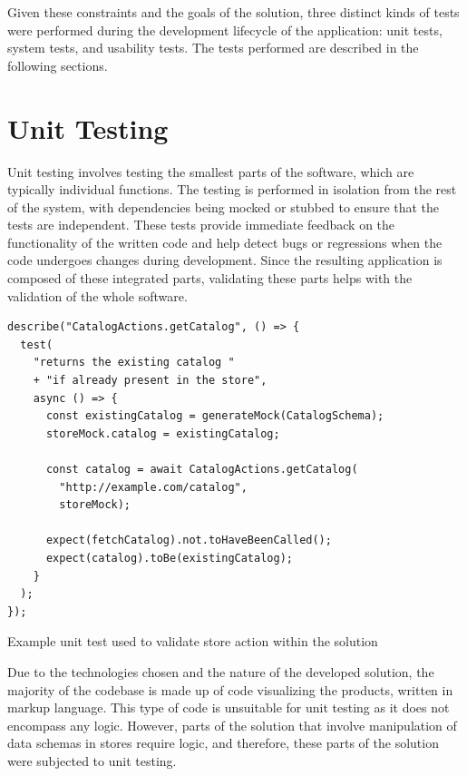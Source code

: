 Given these constraints and the goals of the solution, three distinct kinds of tests were performed during the development lifecycle of the application: unit tests, system tests, and usability tests. The tests performed are described in the following sections.


\section{Unit Testing}

Unit testing involves testing the smallest parts of the software, which are typically individual functions. The testing is performed in isolation from the rest of the system, with dependencies being mocked or stubbed to ensure that the tests are independent. These tests provide immediate feedback on the functionality of the written code and help detect bugs or regressions when the code undergoes changes during development. Since the resulting application is composed of these integrated parts, validating these parts helps with the validation of the whole software. \cite{Khorikov2020}

\begin{listing}[h!]
\begin{verbatim}
describe("CatalogActions.getCatalog", () => {
  test(
    "returns the existing catalog " 
    + "if already present in the store",
    async () => {
      const existingCatalog = generateMock(CatalogSchema);
      storeMock.catalog = existingCatalog;

      const catalog = await CatalogActions.getCatalog(
        "http://example.com/catalog",
        storeMock);

      expect(fetchCatalog).not.toHaveBeenCalled();
      expect(catalog).toBe(existingCatalog);
    }
  );
});
\end{verbatim}
\caption{Example unit test used to validate store action within the solution}
\label{listing:unit-test}
\end{listing}

Due to the technologies chosen and the nature of the developed solution, the majority of the codebase is made up of code visualizing the products, written in markup language. This type of code is unsuitable for unit testing as it does not encompass any logic. However, parts of the solution that involve manipulation of data schemas in stores require logic, and therefore, these parts of the solution were subjected to unit testing.

